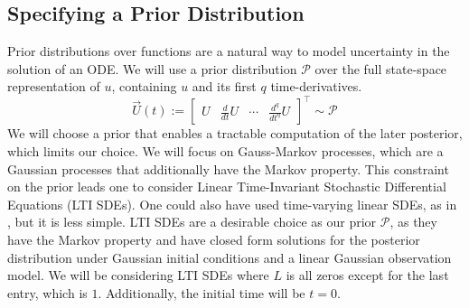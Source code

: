 \subsection*{Specifying a Prior Distribution}
Prior distributions over functions are a natural way to model uncertainty in the solution of an ODE. We will use a prior distribution $\mathcal{P}$ over the full state-space representation of $u$, containing $u$ and its first $q$ time-derivatives. 
$$\vec{U}(t) :=\begin{bmatrix} U & \frac{d}{d t} U & \cdots & \frac{d^q}{d t^q} U\end{bmatrix}^{\top} \sim \mathcal{P}$$
We will choose a prior that enables a tractable computation of the later posterior, which limits our choice. We will focus on Gauss-Markov \cite{probnum} processes, which are a Gaussian processes \cite{gp_Rasmussen} that additionally have the Markov property.
This constraint on the prior leads one to consider Linear Time-Invariant Stochastic Differential Equations (LTI SDEs). One could also have used time-varying linear SDEs, as in \cite{nicoThesis}, but it is less simple.
LTI SDEs are a desirable choice as our prior $\mathcal{P}$, as they have the Markov property and have closed form solutions for the posterior distribution under Gaussian initial conditions and a linear Gaussian observation model.
We will be considering LTI SDEs where $L$ is all zeros except for the last entry, which is $1$. Additionally, the initial time will be $t=0$. 

